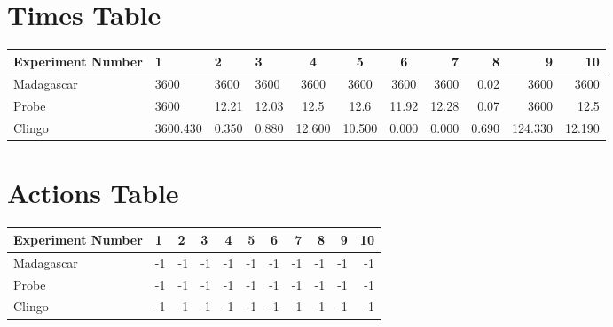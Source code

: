 \documentclass[8pt]{article}
\begin{document}
\begin{landscape}
\section{Times Table}\begin{tabular}{ | l | l | l | l | c | c | c | r | r | r | r | }\hline
Experiment Number & 1 & 2 & 3 & 4 & 5 & 6 & 7 & 8 & 9 & 10\\  \hline
Madagascar & 3600 & 3600 & 3600 & 3600 & 3600 & 3600 & 3600 & 0.02 & 3600 & 3600\\  \hline
Probe & 3600 & 12.21 & 12.03 & 12.5 & 12.6 & 11.92 & 12.28 & 0.07 & 3600 & 12.5\\  \hline
Clingo & 3600.430 & 0.350 & 0.880 & 12.600 & 10.500 & 0.000 & 0.000 & 0.690 & 124.330 & 12.190\\ \hline
\end{tabular}
\section{Actions Table}\begin{tabular}{ | l | l | l | l | c | c | c | r | r | r | r | }\hline
Experiment Number & 1 & 2 & 3 & 4 & 5 & 6 & 7 & 8 & 9 & 10\\ \hline
 Madagascar & -1 & -1 & -1 & -1 & -1 & -1 & -1 & -1 & -1 & -1\\ \hline
 Probe & -1 & -1 & -1 & -1 & -1 & -1 & -1 & -1 & -1 & -1\\ \hline
 Clingo & -1 & -1 & -1 & -1 & -1 & -1 & -1 & -1 & -1 & -1\\ \hline
\end{tabular}
\end{landscape}
\end{document}
